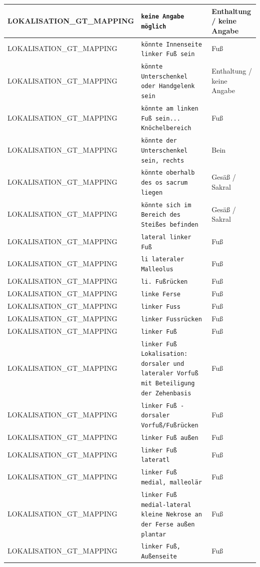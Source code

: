 \begin{longtable}{|p{3.5cm}|p{5cm}|p{6.5cm}|}
LOKALISATION\_GT\_MAPPING & \texttt{keine Angabe möglich} & Enthaltung / keine Angabe \\ \hline
LOKALISATION\_GT\_MAPPING & \texttt{könnte Innenseite linker Fuß sein} & Fuß \\ \hline
LOKALISATION\_GT\_MAPPING & \texttt{könnte Unterschenkel oder Handgelenk sein} & Enthaltung / keine Angabe \\ \hline
LOKALISATION\_GT\_MAPPING & \texttt{könnte am linken Fuß sein... Knöchelbereich} & Fuß \\ \hline
LOKALISATION\_GT\_MAPPING & \texttt{könnte der Unterschenkel sein, rechts} & Bein \\ \hline
LOKALISATION\_GT\_MAPPING & \texttt{könnte oberhalb des os sacrum liegen} & Gesäß / Sakral \\ \hline
LOKALISATION\_GT\_MAPPING & \texttt{könnte sich im Bereich des Steißes befinden} & Gesäß / Sakral \\ \hline
LOKALISATION\_GT\_MAPPING & \texttt{lateral linker Fuß} & Fuß \\ \hline
LOKALISATION\_GT\_MAPPING & \texttt{li lateraler Malleolus} & Fuß \\ \hline
LOKALISATION\_GT\_MAPPING & \texttt{li. Fußrücken} & Fuß \\ \hline
LOKALISATION\_GT\_MAPPING & \texttt{linke Ferse} & Fuß \\ \hline
LOKALISATION\_GT\_MAPPING & \texttt{linker Fuss} & Fuß \\ \hline
LOKALISATION\_GT\_MAPPING & \texttt{linker Fussrücken} & Fuß \\ \hline
LOKALISATION\_GT\_MAPPING & \texttt{linker Fuß} & Fuß \\ \hline
LOKALISATION\_GT\_MAPPING & \texttt{linker Fuß
Lokalisation: dorsaler und lateraler Vorfuß mit Beteiligung der Zehenbasis} & Fuß \\ \hline
LOKALISATION\_GT\_MAPPING & \texttt{linker Fuß - dorsaler Vorfuß/Fußrücken} & Fuß \\ \hline
LOKALISATION\_GT\_MAPPING & \texttt{linker Fuß außen} & Fuß \\ \hline
LOKALISATION\_GT\_MAPPING & \texttt{linker Fuß lateratl} & Fuß \\ \hline
LOKALISATION\_GT\_MAPPING & \texttt{linker Fuß medial, malleolär} & Fuß \\ \hline
LOKALISATION\_GT\_MAPPING & \texttt{linker Fuß medial-lateral 
kleine Nekrose an der Ferse außen plantar} & Fuß \\ \hline
LOKALISATION\_GT\_MAPPING & \texttt{linker Fuß, Außenseite} & Fuß \\ \hline

\end{longtable}
